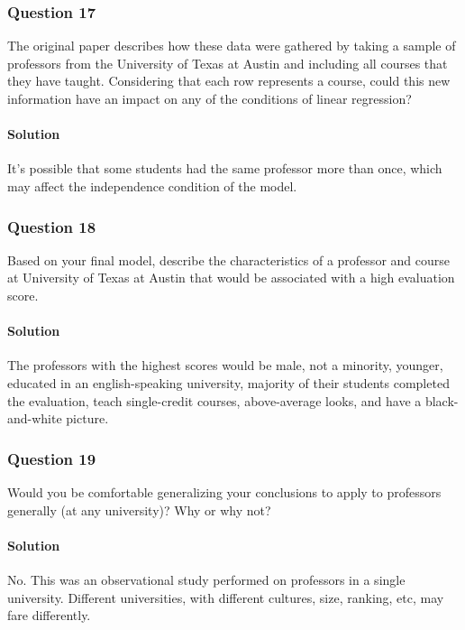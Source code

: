 \documentclass[]{article}
\let\oldparagraph\paragraph
\renewcommand{\paragraph}[1]{\oldparagraph{#1}\mbox{}}
\begin{document}
\subsubsection{Question 17}\label{question-17}

The original paper describes how these data were gathered by taking a
sample of professors from the University of Texas at Austin and
including all courses that they have taught. Considering that each row
represents a course, could this new information have an impact on any of
the conditions of linear regression?

\paragraph{Solution}\label{solution-16}

It's possible that some students had the same professor more than once,
which may affect the independence condition of the model.

\subsubsection{Question 18}\label{question-18}

Based on your final model, describe the characteristics of a professor
and course at University of Texas at Austin that would be associated
with a high evaluation score.

\paragraph{Solution}\label{solution-17}

The professors with the highest scores would be male, not a minority,
younger, educated in an english-speaking university, majority of their
students completed the evaluation, teach single-credit courses,
above-average looks, and have a black-and-white picture.

\subsubsection{Question 19}\label{question-19}

Would you be comfortable generalizing your conclusions to apply to
professors generally (at any university)? Why or why not?

\paragraph{Solution}\label{solution-18}

No. This was an observational study performed on professors in a single
university. Different universities, with different cultures, size,
ranking, etc, may fare differently.
\end{document}
